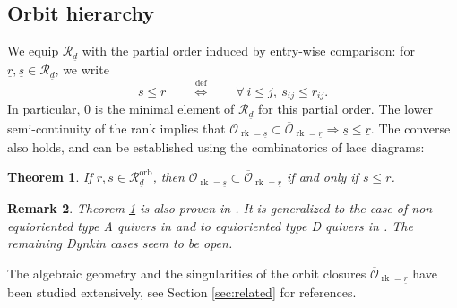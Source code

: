 \documentclass[a4paper]{amsart}
\DeclareMathOperator{\rk}{rk}
\newcommand{\CO}{\mathcal{O}}
\newcommand{\CR}{\mathcal{R}}
\newcommand{\CM}{\mathcal{M}}
\newcommand{\ur}{\underline{r}}
\newcommand{\us}{\underline{s}}
\newcommand{\ud}{\underline{d}}
\newcommand{\orb}{\mathrm{orb}}
\newtheorem{thm}{Theorem}[section]
\theoremstyle{plain}
\newtheorem{remark}[thm]{Remark}
\begin{document}
\subsection{Orbit hierarchy}\label{sec:hierarchy}
We equip $\CR_{\ud}$ with the partial order induced by entry-wise comparison: for $\ur,\us\in \CR_{\ud}$, we write
\[
\us\leq \ur
\qquad
\stackrel{\text{def}}{\Leftrightarrow}
\qquad
\forall\ i\leq j,\ s_{ij}\leq r_{ij}. 
\]
In particular, $\underline{0}$ is the minimal element of $\CR_{\ud}$ for this partial order.  The lower semi-continuity of the rank implies that $\CO_{\rk=\us}\subset \overline{\CO}_{\rk=\ur} \Rightarrow \us\leq \ur$. The converse also holds, and can be established using the combinatorics of lace diagrams:

\begin{thm}{\cite{abeasis-del_fra:equioriented}}\label{thm:closures}
    If $\ur,\us\in \CR^\orb_{\ud}$, then $\CO_{\rk=\us}\subset \overline{\CO}_{\rk=\ur}$ if and only if $\us\leq \ur$. 
\end{thm}

\begin{remark} \rm
Theorem \ref{thm:closures} is also proven in \cite{bhattacharya-shewchuk}.
It is generalized to the case of non equioriented type A quivers in \cite{abeasis-del_fra} and to equioriented type D quivers in \cite{ABEASIS198481}. The remaining Dynkin cases seem to be open.
\end{remark}

 The algebraic geometry and the singularities of the orbit closures $\overline{\CO}_{\rk=\ur}$ have been studied extensively, see Section \ref{sec:related} for references.
 

\end{document}
